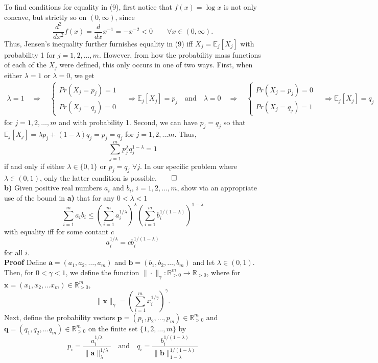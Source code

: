 \documentclass[11pt, letterpaper]{article}
\newcommand{\bs}[1]{\boldsymbol{#1}}
\newcommand{\mbb}[1]{\mathbb{#1}}
\begin{document}
To find conditions for equality in (9), first notice that $f(x)=\log x$ is not only concave, but strictly so on $(0,\infty)$, since
\[\frac{d^2}{dx^2}f(x)=\frac{d}{dx}x^{-1}=-x^{-2}<0\qquad\forall x\in(0,\infty).\]
Thus, Jensen's inequality further furnishes equality in (9) iff $X_j=\mbb{E}_j[X_j]$ with probability 1 for $j=1,2,\dots,m$. However, from how the probability mass functions of
each of the $X_j$ were defined, this only occurs in one of two ways. First, when either $\lambda=1$ or $\lambda=0$, we get
\begin{align*}
    \lambda=1\quad\Rightarrow\quad\begin{cases}
        Pr(X_j=p_j)=1\\
        Pr(X_j=q_j)=0
    \end{cases}\quad\Rightarrow\mbb{E}_j[X_j]=p_j\quad\text{and}\quad\lambda=0\quad\Rightarrow\quad\begin{cases}
        Pr(X_j=p_j)=0\\
        Pr(X_j=q_j)=1
    \end{cases}\quad\Rightarrow\mbb{E}_j[X_j]=q_j
\end{align*}
for $j=1,2,\dots, m$ and with probability 1. Second, we can have $p_j=q_j$ so that $\mbb{E}_j[X_j]=\lambda p_j+(1-\lambda)q_j=p_j=q_j$ for $j=1,2,\dots m$.
Thus,
\[\sum_{j=1}^mp_j^\lambda q_j^{1-\lambda}=1\]
if and only if either $\lambda\in\{0,1\}$ or $p_j=q_j$ $\forall j$. In our specific problem where $\lambda\in(0,1)$, only the latter condition is possible.\hfill{$\qed$}\\[10pt]
{\bf b)} Given positive real numbers $a_i$ and $b_i$, $i=1,2,\dots,m$, show via an appropriate use of the bound in {\bf a)} that for any $0<\lambda<1$
\[\sum_{i=1}^ma_ib_i\leq\left(\sum_{i=1}^ma_i^{1/\lambda}\right)^{\lambda}\left(\sum_{i=1}^mb_i^{1/(1-\lambda)}\right)^{1-\lambda}\]
with equality iff for some contant $c$
\[a_i^{1/\lambda}=cb_i^{1/(1-\lambda)}\]
for all $i$.\\[10pt]
{\bf Proof} Define $\bs{a}=(a_1,a_2,\dots,a_m)$ and $\bs{b}=(b_1,b_2,\dots,b_m)$ and let $\lambda\in (0,1)$. Then, for $0<\gamma<1$, we define the function $\|\cdot\|_\gamma:\mbb{R}^m_{>0}\rightarrow\mbb{R}_{>0}$,
where for $\bs{x}=(x_1,x_2,\dots x_m)\in\mbb{R}^m_{>0}$, 
\[\|\bs{x}\|_\gamma=\left(\sum_{i=1}^mx_i^{1/\gamma}\right)^\gamma.\]
Next, define the probability vectors $\bs{p}=(p_1,p_2,\dots,p_m)\in\mbb{R}^m_{>0}$ and $\bs{q}=(q_1,q_2,\dots q_m)\in\mbb{R}^m_{>0}$ on the finite set $\{1,2,\dots, m\}$ by
\[p_i=\frac{a_i^{1/\lambda}}{\|\bs{a}\|_\lambda^{1/\lambda}}\quad\text{and}\quad q_i=\frac{b_i^{1/(1-\lambda)}}{\|\bs{b}\|_{1-\lambda}^{1/(1-\lambda)}}\]
\end{document}

